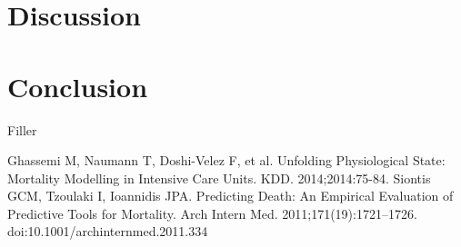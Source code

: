 \documentclass[12pt, final]{article}
\begin{document}
\section{Discussion}
\label{Discussion}

\section{Conclusion}
\label{Conclusion}
Filler

  \begin{thebibliography}{1}
     Ghassemi M, Naumann T, Doshi-Velez F, et al. Unfolding Physiological State: Mortality Modelling in Intensive Care Units. KDD. 2014;2014:75-84.
	 Siontis GCM, Tzoulaki I, Ioannidis JPA. Predicting Death: An Empirical Evaluation of Predictive Tools for Mortality. Arch Intern Med. 2011;171(19):1721–1726. doi:10.1001/archinternmed.2011.334
  
  \end{thebibliography}
\end{document}
